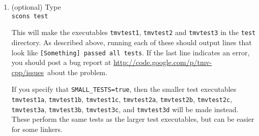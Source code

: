 \documentclass[twoside,letterpaper,11pt]{article}
\newcommand{\myissuesx}{http://code.google.com/p/tmv-cpp/issues}
\newcommand{\myissues}{\url{\myissuesx}}
\begin{document}
\begin{enumerate}
When SCons starts up, it will look through the standard paths, along with any extra paths you have
specified with the above options, to find BLAS
and LAPACK libraries.  This can sometimes require a few iterations to get working correctly.  
You should look at the initial output from SCons to make sure it finds the correct BLAS
and LAPACK libraries that you think it should find.  Here is a sample output:\footnote{
This is the exact output that I get with the default options on my MacBook.}
\begin{verbatim}
$ scons
scons: Reading SConscript files ...

Using compiler: g++-4
compiler version: 4.3.2
Debugging turned off
Checking for MKL... no
Checking for ACML... no
Checking for GotoBLAS... no
Checking for CBLAS... yes
Using CBLAS
Checking for CLAPACK... no
Checking for Fortran LAPACK... yes
Using Fortran LAPACK
scons: done reading SConscript files.
scons: Building targets ...
\end{verbatim}
\vspace{-11pt}(\emph{Starts the actual compiling})

If a "\texttt{Checking for}..." line ends with \texttt{no}, even though you think that library is installed
on your computer, then it probably means that you need to tell SCons which directories
to search, in addition to the standard locations.  The most straightforward way to do this is
with the parameters \texttt{EXTRA\_INCLUDE\_PATH} and \texttt{EXTRA\_LIB\_PATH}.  
These are described in detail above.  See also \texttt{IMPORT\_ENV} and \texttt{IMPORT\_PATHS}.

\item (optional) Type\\
\texttt{scons test}

This will make the executables \texttt{tmvtest1}, \texttt{tmvtest2} and \texttt{tmvtest3} in
the \texttt{test} directory.  As described above, running each of these should output 
lines that look like \texttt{[Something] passed all tests}.  If the last line indicates
an error, you should post a bug report at \myissues\ about the problem.

If you specify that \texttt{SMALL\_TESTS=true}, then the smaller test executables
\texttt{tmvtest1a}, \texttt{tmvtest1b}, \texttt{tmvtest1c}, \texttt{tmvtest2a}, \texttt{tmvtest2b}, \texttt{tmvtest2c},
\texttt{tmvtest3a}, \texttt{tmvtest3b}, \texttt{tmvtest3c}, and \texttt{tmvtest3d} will be made instead.
These perform the same tests as the larger test executables, but can be easier
for some linkers.


\end{enumerate}
\end{document}
